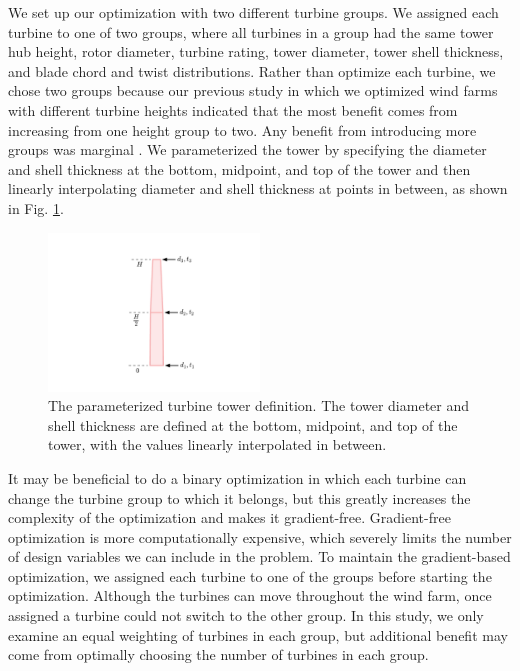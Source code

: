 We set up our optimization with two different turbine groups. We assigned each turbine to one of two groups, where all turbines in a group had the same tower hub height, rotor diameter, turbine rating, tower diameter, tower shell thickness, and blade chord and twist distributions.
Rather than optimize each turbine, we chose two groups because our previous study in which we optimized wind farms with different turbine heights indicated that the most benefit comes from increasing from one height group to two. Any benefit from introducing more groups was marginal \citep{stanley2018}. We parameterized the tower by specifying the diameter and shell thickness at the bottom, midpoint, and top of the tower and then linearly interpolating diameter and shell thickness at points in between, as shown in Fig. \ref{tower_def}.

\begin{figure}[htbp]
  \centering
  \includegraphics[trim={0 1.5cm 0 2cm},clip,width=0.5\textwidth]{Figures/tower_param.pdf}
  \caption{\label{tower_def} The parameterized turbine tower definition. The tower diameter and shell thickness are defined at the bottom, midpoint, and top of the tower, with the values linearly interpolated in between.}
\end{figure}
        
        It may be beneficial to do a binary optimization in which each turbine can change the turbine group to which it belongs, but this greatly increases the complexity of the optimization and makes it gradient-free. Gradient-free optimization is more computationally expensive, which severely limits the number of design variables we can include in the problem. To maintain the gradient-based optimization, we assigned each turbine to one of the groups before starting the optimization. Although the turbines can move throughout the wind farm, once assigned a turbine could not switch to the other group. In this study, we only examine an equal weighting of turbines in each group, but additional benefit may come from optimally choosing the number of turbines in each group.
        
